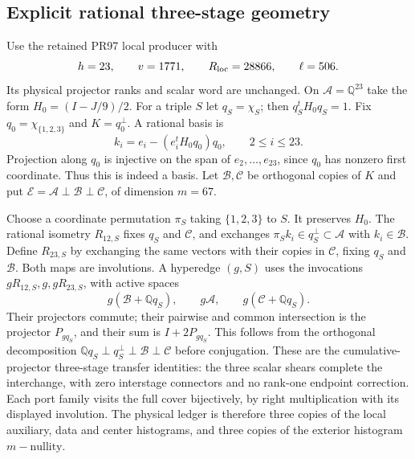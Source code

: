 \subsection{Explicit rational three-stage geometry}
Use the retained PR97 local producer with
\[
 h=23,\qquad v=1771,\qquad R_{\rm loc}=28866,\qquad \ell=506.
\]
Its physical projector ranks and scalar word are unchanged. On
$\mathcal A=\mathbb Q^{23}$ take the form $H_0=(I-J/9)/2$.
For a triple $S$ let $q_S=\chi_S$; then $q_S^tH_0q_S=1$.
Fix $q_0=\chi_{\{1,2,3\}}$ and $K=q_0^\perp$. A rational basis is
\[
 k_i=e_i-(e_i^tH_0q_0)q_0,\qquad 2\le i\le23.
\]
Projection along $q_0$ is injective on the span of $e_2,\ldots,e_{23}$,
since $q_0$ has nonzero first coordinate. Thus this is indeed a basis.
Let $\mathcal B,\mathcal C$ be orthogonal copies of $K$ and put
$\mathcal E=\mathcal A\perp\mathcal B\perp\mathcal C$, of dimension $m=67$.

Choose a coordinate permutation $\pi_S$ taking $\{1,2,3\}$ to $S$.
It preserves $H_0$. The rational isometry $R_{12,S}$ fixes $q_S$ and
$\mathcal C$, and exchanges $\pi_Sk_i\in q_S^\perp\subset\mathcal A$
with $k_i\in\mathcal B$. Define $R_{23,S}$ by exchanging the same vectors
with their copies in $\mathcal C$, fixing $q_S$ and $\mathcal B$.
Both maps are involutions. A hyperedge $(g,S)$ uses the invocations
$gR_{12,S},g,gR_{23,S}$, with active spaces
\[
 g(\mathcal B+\mathbb Qq_S),\qquad g\mathcal A,
 \qquad g(\mathcal C+\mathbb Qq_S).
\]
Their projectors commute; their pairwise and common intersection is the
projector $P_{gq_S}$, and their sum is $I+2P_{gq_S}$.
This follows from the orthogonal decomposition
$\mathbb Qq_S\perp q_S^\perp\perp\mathcal B\perp\mathcal C$ before
conjugation. These are the cumulative-projector three-stage transfer
identities: the three scalar shears complete the interchange, with zero
interstage connectors and no rank-one endpoint correction. Each port
family visits the full cover bijectively, by right multiplication with
its displayed involution. The physical ledger is therefore three copies
of the local auxiliary, data and center histograms, and three copies of
the exterior histogram $m-\text{nullity}$.

